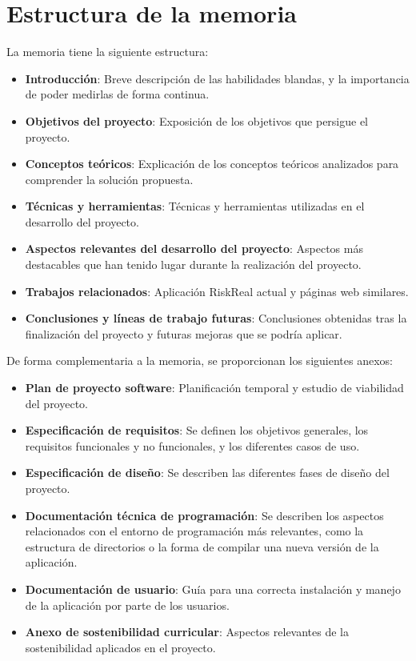 \section{Estructura de la memoria}

La memoria tiene la siguiente estructura:

\begin{itemize}
	\item \textbf{Introducción}: Breve descripción de las habilidades blandas, y la importancia de poder medirlas de forma continua.
	\item \textbf{Objetivos del proyecto}: Exposición de los objetivos que persigue el proyecto.
	\item \textbf{Conceptos teóricos}: Explicación de los conceptos teóricos analizados para comprender la solución propuesta.
	\item \textbf{Técnicas y herramientas}: Técnicas y herramientas utilizadas en el desarrollo del proyecto.
	\item \textbf{Aspectos relevantes del desarrollo del proyecto}: Aspectos más destacables que han tenido lugar durante la realización del proyecto.
	\item \textbf{Trabajos relacionados}: Aplicación RiskReal\cite{web:riskreal} actual y páginas web similares.
	\item \textbf{Conclusiones y líneas de trabajo futuras}: Conclusiones obtenidas tras la finalización del proyecto y futuras mejoras que se podría aplicar.
\end{itemize}

De forma complementaria a la memoria, se proporcionan los siguientes anexos:

\begin{itemize}
	\item \textbf{Plan de proyecto software}: Planificación temporal y estudio de viabilidad del proyecto.
	\item \textbf{Especificación de requisitos}: Se definen los objetivos generales, los requisitos funcionales y no funcionales, y los diferentes casos de uso. 
	\item \textbf{Especificación de diseño}: Se describen las diferentes fases de diseño del proyecto.
	\item \textbf{Documentación técnica de programación}: Se describen los aspectos relacionados con el entorno de programación más relevantes, como la estructura de directorios o la forma de compilar una nueva versión de la aplicación.
	\item \textbf{Documentación de usuario}: Guía para una correcta instalación y manejo de la aplicación por parte de los usuarios.
	\item \textbf{Anexo de sostenibilidad curricular}: Aspectos relevantes de la sostenibilidad aplicados en el proyecto.
\end{itemize}

